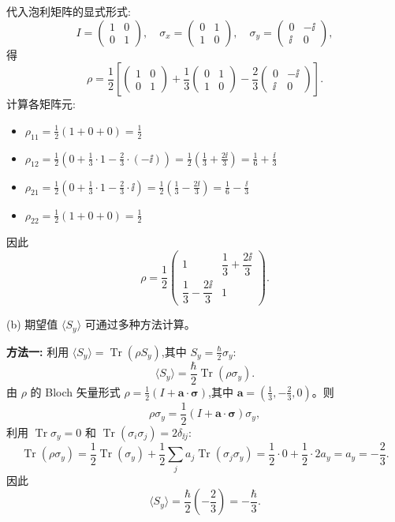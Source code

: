 \begin{solution}
代入泡利矩阵的显式形式:
\[
I = \begin{pmatrix}1&0\\0&1\end{pmatrix},\quad
\sigma_x = \begin{pmatrix}0&1\\1&0\end{pmatrix},\quad
\sigma_y = \begin{pmatrix}0&-\ii\\\ii&0\end{pmatrix},
\]
得
\[
\rho = \frac{1}{2}\left[
\begin{pmatrix}1&0\\0&1\end{pmatrix}
+ \frac{1}{3}\begin{pmatrix}0&1\\1&0\end{pmatrix}
- \frac{2}{3}\begin{pmatrix}0&-\ii\\\ii&0\end{pmatrix}
\right].
\]
计算各矩阵元:
\begin{itemize}
\item $\rho_{11} = \frac{1}{2}(1 + 0 + 0) = \frac{1}{2}$
\item $\rho_{12} = \frac{1}{2}\left(0 + \frac{1}{3}\cdot 1 - \frac{2}{3}\cdot(-\ii)\right) = \frac{1}{2}\left(\frac{1}{3} + \frac{2\ii}{3}\right) = \frac{1}{6} + \frac{\ii}{3}$
\item $\rho_{21} = \frac{1}{2}\left(0 + \frac{1}{3}\cdot 1 - \frac{2}{3}\cdot \ii\right) = \frac{1}{2}\left(\frac{1}{3} - \frac{2\ii}{3}\right) = \frac{1}{6} - \frac{\ii}{3}$
\item $\rho_{22} = \frac{1}{2}(1 + 0 + 0) = \frac{1}{2}$
\end{itemize}
因此
\[
\boxed{\rho = \frac{1}{2}\begin{pmatrix}
1 & \dfrac{1}{3} + \dfrac{2\ii}{3}\\[6pt]
\dfrac{1}{3} - \dfrac{2\ii}{3} & 1
\end{pmatrix}.}
\]

(b) 期望值 $\langle S_y\rangle$ 可通过多种方法计算。

\textbf{方法一:} 利用 $\langle S_y\rangle = \operatorname{Tr}(\rho S_y)$,其中 $S_y = \frac{\hbar}{2}\sigma_y$:
\[
\langle S_y\rangle = \frac{\hbar}{2}\operatorname{Tr}(\rho\sigma_y).
\]
由 $\rho$ 的 Bloch 矢量形式 $\rho = \frac{1}{2}(I + \mathbf a\cdot\boldsymbol\sigma)$,其中 $\mathbf a = \left(\frac{1}{3}, -\frac{2}{3}, 0\right)$。则
\[
\rho\sigma_y = \frac{1}{2}(I + \mathbf a\cdot\boldsymbol\sigma)\sigma_y,
\]
利用 $\operatorname{Tr}\sigma_y = 0$ 和 $\operatorname{Tr}(\sigma_i\sigma_j)=2\delta_{\ii j}$:
\[
\operatorname{Tr}(\rho\sigma_y) = \frac{1}{2}\operatorname{Tr}(\sigma_y) + \frac{1}{2}\sum_j a_j\operatorname{Tr}(\sigma_j\sigma_y) = \frac{1}{2}\cdot 0 + \frac{1}{2}\cdot 2a_y = a_y = -\frac{2}{3}.
\]
因此
\[
\boxed{\langle S_y\rangle = \frac{\hbar}{2}\left(-\frac{2}{3}\right) = -\frac{\hbar}{3}.}
\]


\end{solution}
